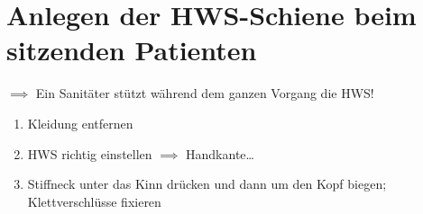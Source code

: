 \chapter{Anlegen der HWS-Schiene beim sitzenden Patienten}
$\implies$ Ein Sanitäter stützt während dem ganzen Vorgang die HWS!
\begin{enumerate}
    \item Kleidung entfernen
    \item HWS richtig einstellen $\implies$ Handkante\dots
    \item Stiffneck unter das Kinn drücken und dann um den Kopf biegen; Klettverschlüsse fixieren
\end{enumerate}